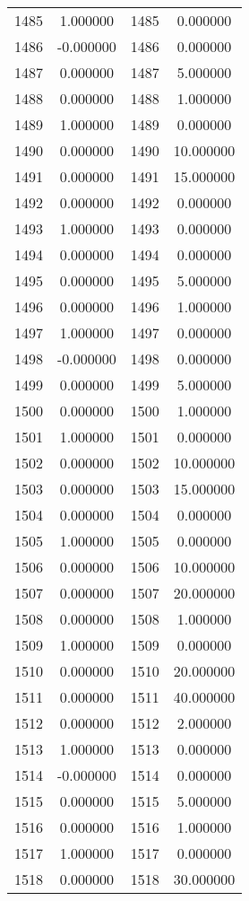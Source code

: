 \documentclass[12pt]{article}
\begin{document}
\begin{longtable}{@{}cccc@{}}
1485 & 1.000000 & 1485 & 0.000000 \\
1486 & -0.000000 & 1486 & 0.000000 \\
1487 & 0.000000 & 1487 & 5.000000 \\
1488 & 0.000000 & 1488 & 1.000000 \\
1489 & 1.000000 & 1489 & 0.000000 \\
1490 & 0.000000 & 1490 & 10.000000 \\
1491 & 0.000000 & 1491 & 15.000000 \\
1492 & 0.000000 & 1492 & 0.000000 \\
1493 & 1.000000 & 1493 & 0.000000 \\
1494 & 0.000000 & 1494 & 0.000000 \\
1495 & 0.000000 & 1495 & 5.000000 \\
1496 & 0.000000 & 1496 & 1.000000 \\
1497 & 1.000000 & 1497 & 0.000000 \\
1498 & -0.000000 & 1498 & 0.000000 \\
1499 & 0.000000 & 1499 & 5.000000 \\
1500 & 0.000000 & 1500 & 1.000000 \\
1501 & 1.000000 & 1501 & 0.000000 \\
1502 & 0.000000 & 1502 & 10.000000 \\
1503 & 0.000000 & 1503 & 15.000000 \\
1504 & 0.000000 & 1504 & 0.000000 \\
1505 & 1.000000 & 1505 & 0.000000 \\
1506 & 0.000000 & 1506 & 10.000000 \\
1507 & 0.000000 & 1507 & 20.000000 \\
1508 & 0.000000 & 1508 & 1.000000 \\
1509 & 1.000000 & 1509 & 0.000000 \\
1510 & 0.000000 & 1510 & 20.000000 \\
1511 & 0.000000 & 1511 & 40.000000 \\
1512 & 0.000000 & 1512 & 2.000000 \\
1513 & 1.000000 & 1513 & 0.000000 \\
1514 & -0.000000 & 1514 & 0.000000 \\
1515 & 0.000000 & 1515 & 5.000000 \\
1516 & 0.000000 & 1516 & 1.000000 \\
1517 & 1.000000 & 1517 & 0.000000 \\
1518 & 0.000000 & 1518 & 30.000000 \\

\end{longtable}
\end{document}

